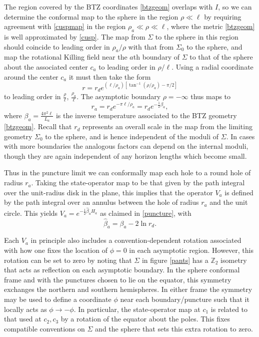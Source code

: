 \documentclass[12pt]{article}
\numberwithin{equation}{section}
\begin{document}
The region covered by the BTZ coordinates \eqref{btzgeom} overlaps with $I$, so we can determine the conformal map to the sphere in the region $\rho \ll \ell$ by requiring agreement with \eqref{cuspmap} in the region $\rho_a \ll \rho \ll \ell$, where the metric \eqref{btzgeom}  is well approximated by \eqref{cusp}.  The map from $\Sigma$ to the sphere in this region should coincide to leading order in $\rho_a/\rho$ with that from $\Sigma_0$ to the sphere, and map the rotational Killing field near the $a$th boundary of $\Sigma$ to that of the sphere about the associated center $c_a$ to leading order in $\rho/\ell$. Using a radial coordinate around the center $c_a$ it must then take the form
\begin{equation}
r = r_d e^{\left(\ell /\rho_a\right) [\tan^{-1} (\rho/\rho_a) - \pi/2]}
\end{equation}
to leading order in $\frac{\rho}{\ell}$, $\frac{\rho_a}{\ell}$.
The asymptotic boundary $\rho = - \infty$ thus maps to
\begin{equation}
r_a = r_d e^{-\pi \ell/ \rho_a} = r_d e^{-\frac{1}{2} \beta_a},
\end{equation}
where $\beta_a = \frac{4 \pi^2 \ell}{L_a}$ is the inverse temperature associated to the BTZ geometry \eqref{btzgeom}. Recall that $r_d$ represents an overall scale in the  map from the limiting geometry $\Sigma_0$ to the sphere, and is hence independent of the moduli of $\Sigma$. In cases with more boundaries the analogous factors can depend on the internal moduli, though they are again independent of any horizon lengths which become small.

Thus in the puncture limit we can conformally map each hole to a round hole of radius $r_a$. Taking the state-operator map to be  that given by the path integral over the unit-radius disk in the plane, this implies that the operator $V_a$ is defined by the path integral over an annulus between the hole of radius $r_a$ and the unit circle.  This yields $V_a = e^{- \frac{1}{2} \hat \beta_a H_a}$ as claimed in \eqref{puncture}, with
\begin{equation}
\label{hb}
\hat \beta_a = \beta_a - 2 \ln r_d.
\end{equation}

Each $V_a$ in principle also includes a convention-dependent rotation associated with how one fixes the location of $\phi=0$ in each asymptotic region.  However, this rotation can be set to zero by noting that $\Sigma$ in figure \ref{pants} has a $\mathbb Z_2$ isometry that acts as reflection on each asymptotic boundary.  In the sphere conformal frame and with the punctures chosen to lie on the equator, this symmetry exchanges the northern and southern hemispheres.  In either frame the symmetry may be used to define a coordinate $\phi$ near each boundary/puncture such that it locally acts as $\phi \rightarrow - \phi$. In particular, the state-operator map at $c_1$ is related to that used at $c_2,c_3$ by a rotation of the equator about the poles.   This fixes compatible conventions on $\Sigma$ and the sphere that sets this extra rotation to zero.
\end{document}
